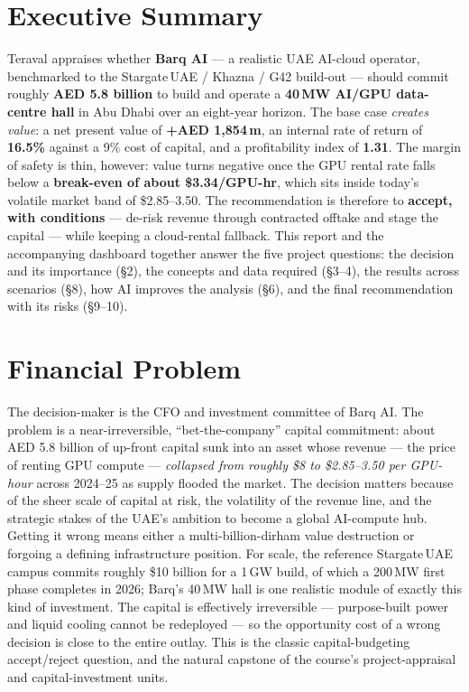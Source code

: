 \documentclass[12pt,a4paper]{article}
\begin{document}
\section{Executive Summary}
Teraval appraises whether \textbf{Barq AI} --- a realistic UAE AI-cloud operator, benchmarked
to the Stargate\,UAE / Khazna / G42 build-out --- should commit roughly \textbf{AED 5.8 billion}
to build and operate a \textbf{40\,MW AI/GPU data-centre hall} in Abu Dhabi over an eight-year
horizon. The base case \emph{creates value}: a net present value of \textbf{+AED 1{,}854\,m},
an internal rate of return of \textbf{16.5\%} against a 9\% cost of capital, and a profitability
index of \textbf{1.31}. The margin of safety is thin, however: value turns negative once the GPU
rental rate falls below a \textbf{break-even of about \$3.34/GPU-hr}, which sits inside today's
volatile market band of \$2.85--3.50. The recommendation is therefore to \textbf{accept, with
conditions} --- de-risk revenue through contracted offtake and stage the capital --- while keeping
a cloud-rental fallback. This report and the accompanying dashboard together answer the five
project questions: the decision and its importance (\S2), the concepts and data required (\S3--4),
the results across scenarios (\S8), how AI improves the analysis (\S6), and the final
recommendation with its risks (\S9--10).

\section{Financial Problem}
The decision-maker is the CFO and investment committee of Barq AI. The problem is a
near-irreversible, ``bet-the-company'' capital commitment: about AED 5.8 billion of up-front
capital sunk into an asset whose revenue --- the price of renting GPU compute --- \emph{collapsed
from roughly \$8 to \$2.85--3.50 per GPU-hour} across 2024--25 as supply flooded the market. The
decision matters because of the sheer scale of capital at risk, the volatility of the revenue
line, and the strategic stakes of the UAE's ambition to become a global AI-compute hub. Getting
it wrong means either a multi-billion-dirham value destruction or forgoing a defining
infrastructure position. For scale, the reference Stargate\,UAE campus commits roughly
\$10 billion for a 1\,GW build, of which a 200\,MW first phase completes in 2026; Barq's 40\,MW
hall is one realistic module of exactly this kind of investment. The capital is effectively
irreversible --- purpose-built power and liquid cooling cannot be redeployed --- so the
opportunity cost of a wrong decision is close to the entire outlay. This is the classic
capital-budgeting accept/reject question, and the natural capstone of the course's
project-appraisal and capital-investment units.
\end{document}
